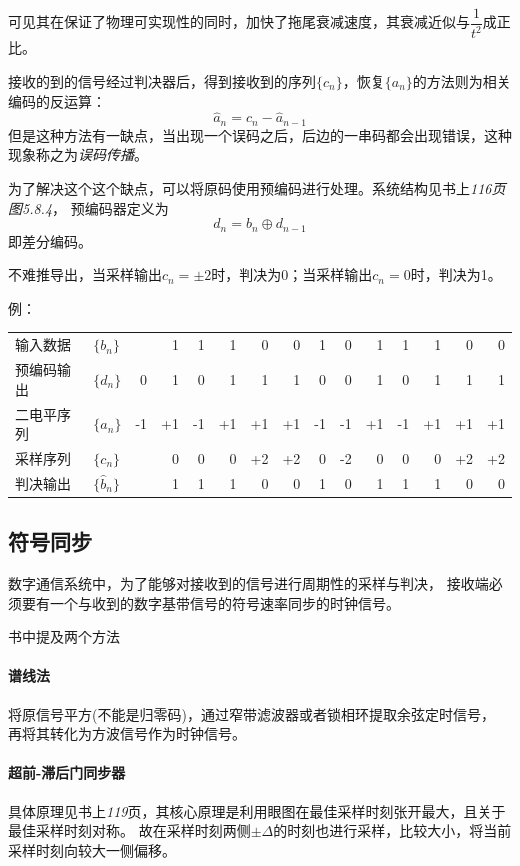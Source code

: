     可见其在保证了物理可实现性的同时，加快了拖尾衰减速度，其衰减近似与$\dfrac{1}{t^2}$成正比。

    接收的到的信号经过判决器后，得到接收到的序列$\{c_n\}$，恢复$\{a_n\}$的方法则为相关编码的反运算：
    \begin{equation}
        \hat{a}_n=c_n-\hat{a}_{n-1}
    \end{equation}
    但是这种方法有一缺点，当出现一个误码之后，后边的一串码都会出现错误，这种现象称之为\emph{误码传播}。
    
    为了解决这个这个缺点，可以将原码使用预编码进行处理。系统结构见书上\emph{116页图5.8.4}，
    预编码器定义为
    \begin{equation}
        d_n=b_n\oplus d_{n-1}
    \end{equation}
    即差分编码。

    不难推导出，当采样输出$c_n=\pm 2$时，判决为0；当采样输出$c_n=0$时，判决为1。

    例：
    \begin{table}[H]
        \centering
        \begin{tabular}{ll|*{13}{r}}
            \textcolor{bupt}{输入数据}  & $\{b_n\}$       &  & 1& 1& 1& 0& 0& 1& 0& 1& 1& 1& 0& 0\\ \Xhline{0.3pt}
            \textcolor{bupt}{预编码输出}& $\{d_n\}$       & 0& 1& 0& 1& 1& 1& 0& 0& 1& 0& 1& 1& 1\\ \Xhline{0.3pt}
            \textcolor{bupt}{二电平序列}& $\{a_n\}$       &-1&+1&-1&+1&+1&+1&-1&-1&+1&-1&+1&+1&+1\\ \Xhline{0.3pt}
            \textcolor{bupt}{采样序列}  & $\{c_n\}$       &  & 0& 0& 0&+2&+2& 0&-2& 0& 0& 0&+2&+2\\ \Xhline{0.3pt}
            \textcolor{bupt}{判决输出}  & $\{\hat{b}_n\}$ &  & 1& 1& 1& 0& 0& 1& 0& 1& 1& 1& 0& 0
        \end{tabular}
    \end{table}

\subsection{符号同步}
    数字通信系统中，为了能够对接收到的信号进行周期性的采样与判决，
    接收端必须要有一个与收到的数字基带信号的符号速率同步的时钟信号。

    书中提及两个方法

    \paragraph{谱线法}\mbox{}

    将原信号平方(不能是归零码)，通过窄带滤波器或者锁相环提取余弦定时信号，
    再将其转化为方波信号作为时钟信号。

    \paragraph{超前-滞后门同步器}

    具体原理见书上\emph{119}页，其核心原理是利用眼图在最佳采样时刻张开最大，且关于最佳采样时刻对称。
    故在采样时刻两侧$\pm\Delta$的时刻也进行采样，比较大小，将当前采样时刻向较大一侧偏移。




